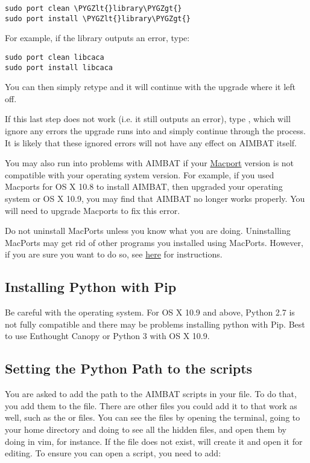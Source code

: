 \documentclass[letterpaper,10pt,english]{sphinxmanual}
\def\PYGZlt{\char`\<}
\def\PYGZgt{\char`\>}
\begin{document}
\begin{Verbatim}[commandchars=\\\{\}]
sudo port clean \PYGZlt{}library\PYGZgt{}
sudo port install \PYGZlt{}library\PYGZgt{}
\end{Verbatim}

For example, if the library  outputs an error, type:

\begin{Verbatim}[commandchars=\\\{\}]
sudo port clean libcaca
sudo port install libcaca
\end{Verbatim}

You can then simply retype  and it will continue with the upgrade where it left off.

If this last step does not work (i.e. it still outputs an error), type , which will ignore any errors the upgrade runs into and simply continue through the process. It is likely that these ignored errors will not have any effect on AIMBAT itself.

You may also run into problems with AIMBAT if your \href{http://www.macports.org/}{Macport} version is not compatible with your operating system version. For example, if you used Macports for OS X 10.8 to install AIMBAT, then upgraded your operating system or OS X 10.9, you may find that AIMBAT no longer works properly. You will need to upgrade Macports to fix this error.

Do not uninstall MacPorts unless you know what you are doing. Uninstalling MacPorts may get rid of other programs you installed using MacPorts. However, if you are sure you want to do so, see \href{https://guide.macports.org/chunked/installing.macports.uninstalling.html}{here} for instructions.


\subsection{Installing Python with Pip}
\label{docfiles/install_dependencies:installing-python-with-pip}
Be careful with the operating system. For OS X 10.9 and above, Python 2.7 is not fully compatible and there may be problems installing python with Pip. Best to use Enthought Canopy or Python 3 with OS X 10.9.


\subsection{Setting the Python Path to the scripts}
\label{docfiles/install_dependencies:setting-the-python-path-to-the-scripts}
You are asked to add the path to the AIMBAT scripts in your file. To do that, you add them to the  file. There are other files you could add it to that work as well, such as the  or  files. You can see the files by opening the terminal, going to your home directory and doing  to see all the hidden files, and open them by doing  in vim, for instance. If the  file does not exist,  will create it and open it for editing. To ensure you can open a script, you need to add:
\end{document}
